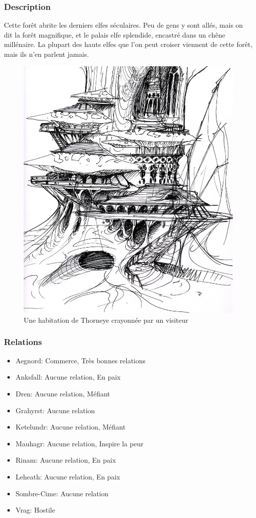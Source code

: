 \subsubsection{Description}
\hypertarget{thorneye}{}Cette forêt abrite les derniers elfes séculaires.
Peu de gens y sont allés, mais on dit la forêt magnifique, et le palais elfe splendide, encastré dans un chêne millénaire.
La plupart des hauts elfes que l'on peut croiser viennent de cette forêt, mais ils n'en parlent jamais.
\begin{figure}[h]
\begin{center}
\includegraphics[scale=0.25]{./Ressources/medieval/habitation_thorneye.jpg}
\caption{Une habitation de Thorneye crayonnée par un visiteur}
\end{center}
\end{figure}
\subsubsection{Relations}
\begin{itemize}
\item Aegnord: Commerce, Très bonnes relations
\item Anksfall: Aucune relation, En paix 
\item Dren: Aucune relation, Méfiant    
\item Grahyrst: Aucune relation
\item Ketelundr: Aucune relation, Méfiant 
\item Mauhagr: Aucune relation, Inspire la peur
\item Rinam: Aucune relation, En paix 
\item Leheath:  Aucune relation, En paix 
\item Sombre-Cime: Aucune relation  
\item Vrag: Hostile
\end{itemize}
